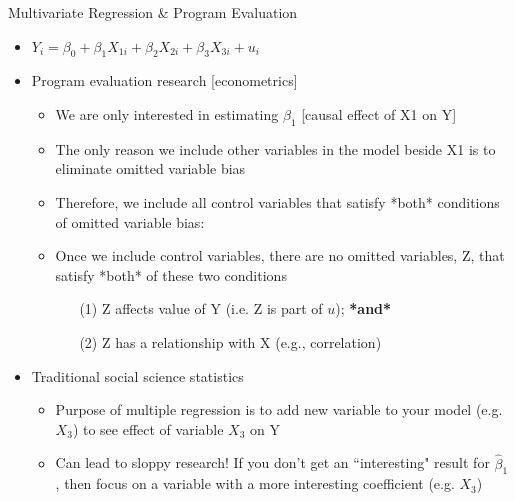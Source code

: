 \begin{frame}[shrink=10]{Multivariate Regression \& Program Evaluation}
	\begin{itemize}
	\item $Y_{i} = \beta_{0} + \beta_{1}X_{1i} + \beta_{2}X_{2i} + \beta_{3}X_{3i} + u_{i}$
	\item Program evaluation research [econometrics]
		\begin{itemize}
		\item We are only interested in estimating $\beta_{1}$ [causal effect of X1 on Y]
		\item The only reason we include other variables in the model beside X1 is to eliminate omitted variable bias
		\item Therefore, we include all control variables that satisfy *both* conditions of omitted variable bias:
		\item Once we include control variables, there are no omitted variables, Z, that satisfy *both* of these two conditions
			\begin{itemize}
			\item[(1)] Z affects value of Y (i.e. Z is part of $u$); \textbf{*and*}
			\item[(2)] Z has a relationship with X (e.g., correlation)
			\end{itemize}
		\end{itemize}
	\item Traditional social science statistics
		\begin{itemize}
		\item Purpose of multiple regression is to add new variable to your model (e.g. $X_{3}$) to see effect of variable $X_{3}$ on Y
		\item Can lead to sloppy research! If you don't get an ``interesting" result for $\hat{\beta}_{1}$, then focus on a variable with a more interesting coefficient (e.g. $X_{3}$)
		\end{itemize}
	\end{itemize}
\end{frame}



